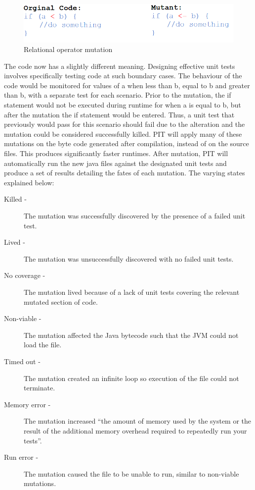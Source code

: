 \documentclass[a4paper,12pt]{article}
\begin{document}
\begin{figure}[h]
    \includegraphics[scale = 0.65]{mutation.png}
    \caption{Relational operator mutation}
    \label{fig:mutation}
\end{figure}
    
The code now has a slightly different meaning. Designing effective unit tests involves specifically testing code at such boundary cases. The behaviour of the code would be monitored for values of a when less than b, equal to b and greater than b, with a separate test for each scenario. Prior to the mutation, the if statement would not be executed during runtime for when a is equal to b, but after the mutation the if statement would be entered. Thus, a unit test that previously would pass for this scenario should fail due to the alteration and the mutation could be considered successfully killed. PIT will apply many of these mutations on the byte code generated after compilation, instead of on the source files. This produces significantly faster runtimes. After mutation, PIT will automatically run the new java files against the designated unit tests and produce a set of results detailing the fates of each mutation. The varying states explained below:

\begin{description}
    \item[Killed - ]The mutation was successfully discovered by the presence of a failed unit test.
    \item[Lived -]The mutation was unsuccessfully discovered with no failed unit tests. 
    \item[No coverage -]The mutation lived because of a lack of unit tests covering the relevant mutated section of code. 
    \item[Non-viable -]The mutation affected the Java bytecode such that the JVM could not load the file.
    \item[Timed out -]The mutation created an infinite loop so execution of the file could not terminate. 
    \item[Memory error -]The mutation increased “the amount of memory used by the system or the result of the additional memory overhead required to repeatedly run your tests”.
    \item[Run error -]The mutation caused the file to be unable to run, similar to non-viable mutations.
\end{description}
\end{document}
